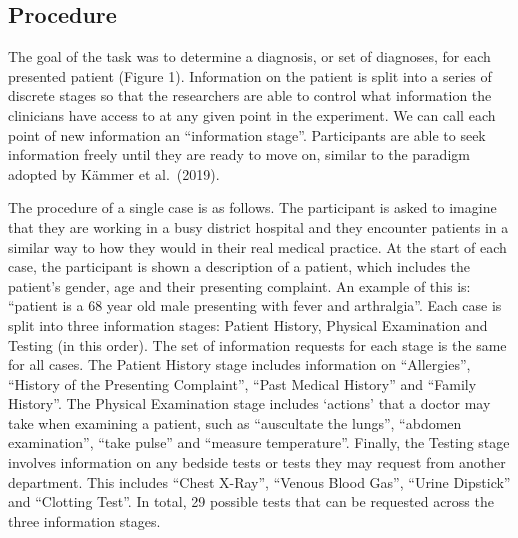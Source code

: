 \documentclass[a4paper, nobind]{templates/ociamthesis}
\begin{document}
\hypertarget{procedure}{%
\subsection*{Procedure}\label{procedure}}

The goal of the task was to determine a diagnosis, or set of diagnoses, for each presented patient (Figure 1). Information on the patient is split into a series of discrete stages so that the researchers are able to control what information the clinicians have access to at any given point in the experiment. We can call each point of new information an ``information stage''. Participants are able to seek information freely until they are ready to move on, similar to the paradigm adopted by Kämmer et al.~(2019).

The procedure of a single case is as follows. The participant is asked to imagine that they are working in a busy district hospital and they encounter patients in a similar way to how they would in their real medical practice. At the start of each case, the participant is shown a description of a patient, which includes the patient's gender, age and their presenting complaint. An example of this is: ``patient is a 68 year old male presenting with fever and arthralgia''. Each case is split into three information stages: Patient History, Physical Examination and Testing (in this order). The set of information requests for each stage is the same for all cases. The Patient History stage includes information on ``Allergies'', ``History of the Presenting Complaint'', ``Past Medical History'' and ``Family History''. The Physical Examination stage includes `actions' that a doctor may take when examining a patient, such as ``auscultate the lungs'', ``abdomen examination'', ``take pulse'' and ``measure temperature''. Finally, the Testing stage involves information on any bedside tests or tests they may request from another department. This includes ``Chest X-Ray'', ``Venous Blood Gas'', ``Urine Dipstick'' and ``Clotting Test''. In total, 29 possible tests that can be requested across the three information stages.
\end{document}
